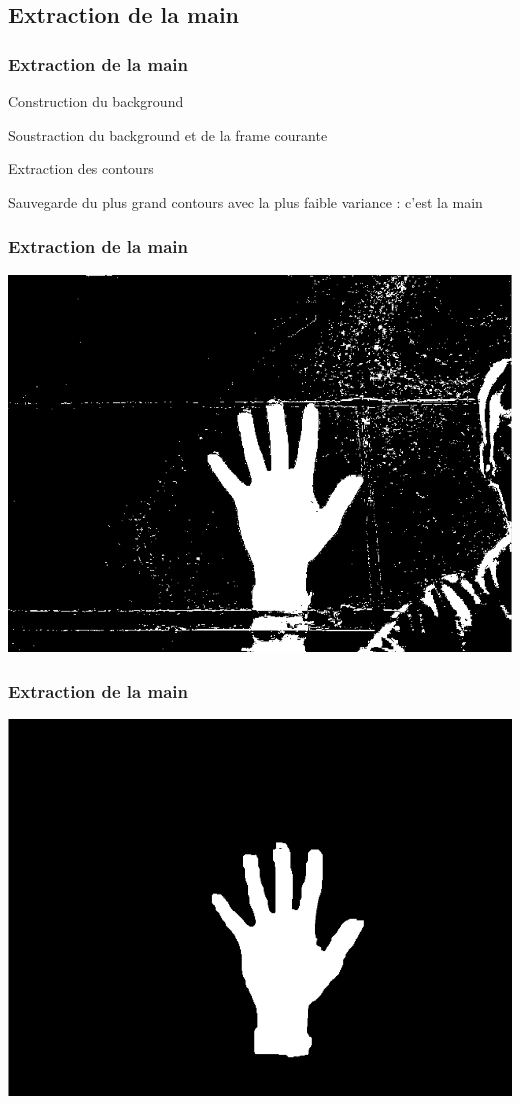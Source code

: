 \documentclass{beamer}
\begin{document}
\subsection{Extraction de la main}
\begin{frame}
  \frametitle{Extraction de la main}
  \begin{block}{}
    Construction du background
  \end{block}
  \begin{block}{}
    Soustraction du background et de la frame courante
  \end{block}
  \begin{block}{}
    Extraction des contours
  \end{block}
  \begin{block}{}
    Sauvegarde du plus grand contours avec la plus faible variance : c'est la main
  \end{block}
\end{frame}
\begin{frame}
  \frametitle{Extraction de la main}
  \includegraphics[scale=0.3]{background.png}
\end{frame}
\begin{frame}
  \frametitle{Extraction de la main}
  \includegraphics[scale=0.3]{background_hand.png}
\end{frame}
\end{document}
